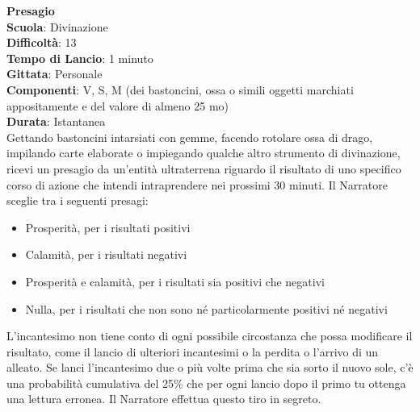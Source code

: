 \begin{multicols}{2}
\medskip\textbf{Presagio}\\
\textbf{Scuola}: Divinazione\\
\textbf{Difficoltà}: 13\\
\textbf{Tempo di Lancio}: 1 minuto\\
\textbf{Gittata}: Personale\\
\textbf{Componenti}: V, S, M (dei bastoncini, ossa o simili oggetti marchiati appositamente e del valore di almeno 25 mo)\\
\textbf{Durata}: Istantanea\\
Gettando bastoncini intarsiati con gemme, facendo rotolare ossa di drago, impilando carte elaborate o impiegando qualche altro strumento di divinazione, ricevi un presagio da un'entità ultraterrena riguardo il risultato di uno specifico corso di azione che intendi intraprendere nei prossimi 30 minuti. Il Narratore sceglie tra i seguenti presagi:
\medskip
\begin{itemize}
\item 
Prosperità, per i risultati positivi
\item 
Calamità, per i risultati negativi
\item 
Prosperità e calamità, per i risultati sia positivi che negativi
\item 
Nulla, per i risultati che non sono né particolarmente positivi né negativi
\end{itemize}
\medskip
L'incantesimo non tiene conto di ogni possibile circostanza che possa modificare il risultato, come il lancio di ulteriori incantesimi o la perdita o l'arrivo di un alleato. Se lanci l'incantesimo due o più volte prima che sia sorto il nuovo sole, c'è una probabilità cumulativa del 25\% che per ogni lancio dopo il primo tu ottenga una lettura erronea. Il Narratore effettua questo tiro in segreto.


\end{multicols}

